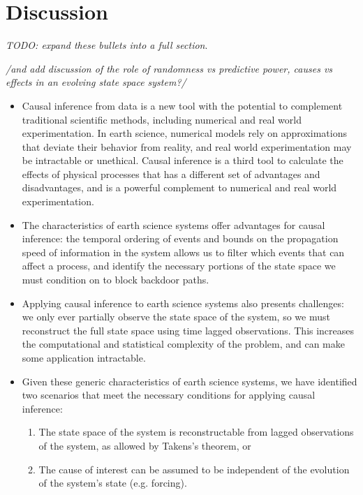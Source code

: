 \documentclass[12pt]{article}
\begin{document}
\section{Discussion}

\emph{TODO: expand these bullets into a full section}.

\emph{/and add discussion of the role of randomness vs predictive
  power, causes vs effects in an evolving state space system?/}

\begin{itemize}
\item Causal inference from data is a new tool with the potential to
  complement traditional scientific methods, including numerical and
  real world experimentation. In earth science, numerical models rely
  on approximations that deviate their behavior from reality, and real
  world experimentation may be intractable or unethical. Causal
  inference is a third tool to calculate the effects of physical
  processes that has a different set of advantages and
  disadvantages, and is a powerful complement to numerical and real
  world experimentation.
\item The characteristics of earth science systems offer advantages
  for causal inference: the temporal ordering of events and bounds on
  the propagation speed of information in the system allows us to
  filter which events that can affect a process, and identify the
  necessary portions of the state space we must condition on to block
  backdoor paths.
\item Applying causal inference to earth science systems also presents
  challenges: we only ever partially observe the state space of the
  system, so we must reconstruct the full state space using time
  lagged observations. This increases the computational and
  statistical complexity of the problem, and can make some application
  intractable.
\item Given these generic characteristics of earth science systems, we
  have identified two scenarios that meet the necessary conditions for
  applying causal inference:
  \begin{enumerate}
  \item The state space of the system is reconstructable
    from lagged observations of the system, as allowed by
    Takens's theorem, or
  \item The cause of interest can be assumed to be
    independent of the evolution of the system's state
    (e.g. forcing).
  \end{enumerate}
\end{itemize}





\end{document}
